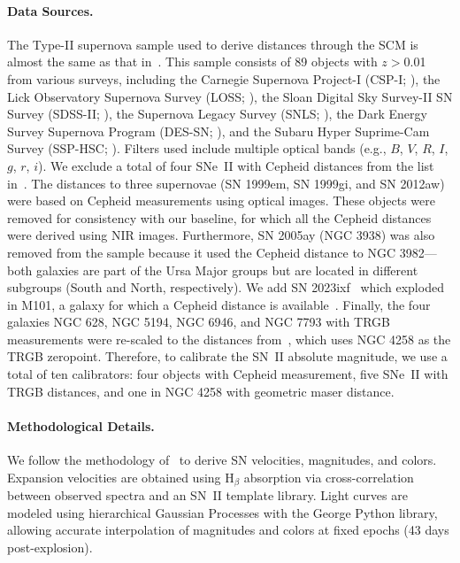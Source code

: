 \paragraph{Data Sources.}
The Type-II supernova sample used to derive distances through the SCM is almost the same as that in~\citet{2022MNRAS.514.4620D}. This sample consists of 89 objects with $z>$0.01 from various surveys, including the Carnegie Supernova Project-I (CSP-I; \citealt{2024A&A...692A..95A}), the Lick Observatory Supernova Survey (LOSS; \citealt{2019MNRAS.490.2799D}), the Sloan Digital Sky Survey-II SN Survey (SDSS-II; \citealt{2010ApJ...708..661D}), the Supernova Legacy Survey (SNLS; \citealt{2006ApJ...645..841N}), the Dark Energy Survey Supernova Program (DES-SN; \citealt{2020MNRAS.495.4860D}), and the Subaru Hyper Suprime-Cam Survey (SSP-HSC; \citealt{2017MNRAS.472.4233D}).  Filters used include multiple optical bands (e.g., $B$, $V$, $R$, $I$, $g$, $r$, $i$).
We exclude a total of four SNe~II with Cepheid distances from the list in~\citet{2022MNRAS.514.4620D}. The distances to three supernovae (SN 1999em, SN 1999gi, and SN 2012aw) were based on Cepheid measurements using optical images. These objects were removed for consistency with our baseline, for which all the Cepheid distances were derived using NIR images. Furthermore, SN 2005ay (NGC 3938) was also removed from the sample because it used the Cepheid distance to NGC 3982---both galaxies are part of the Ursa Major groups but are located in different subgroups (South and North, respectively). We add SN 2023ixf~\citep{2025arXiv250313974Z} which exploded in M101, a galaxy for which a Cepheid distance is available~\citep{2022ApJ...934L...7R}.
Finally, the four galaxies NGC 628, NGC 5194, NGC 6946, and NGC 7793 \citep[5~SNe II used by][]{2022MNRAS.514.4620D} with TRGB measurements were re-scaled to the distances from~\citet{2022ApJ...932...15A}, which uses NGC 4258 as the TRGB zeropoint.
Therefore, to calibrate the SN~II absolute magnitude, we use a total of ten calibrators: four objects with Cepheid measurement, five SNe~II with TRGB distances, and one in NGC 4258 with geometric maser distance.

\paragraph{Methodological Details.}
We follow the methodology of~\citet{2020MNRAS.495.4860D} to derive SN velocities, magnitudes, and colors. Expansion velocities are obtained using H$_\beta$ absorption via cross-correlation between observed spectra and an SN~II template library. Light curves are modeled using hierarchical Gaussian Processes with the George Python library, allowing accurate interpolation of magnitudes and colors at fixed epochs (43 days post-explosion).


